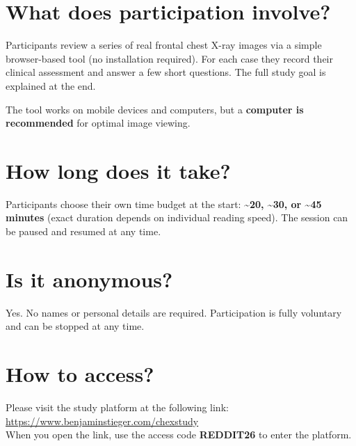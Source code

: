 \documentclass[10pt,a4paper]{article}
\begin{document}
\section{What does participation involve?}

Participants review a series of real frontal chest X-ray images via a simple browser-based tool (no installation required). For each case they record their clinical assessment and answer a few short questions. The full study goal is explained at the end. 

The tool works on mobile devices and computers, but a \textbf{computer is recommended} for optimal image viewing.

\section{How long does it take?}

Participants choose their own time budget at the start: \textbf{\textasciitilde20, \textasciitilde30, or \textasciitilde45 minutes} (exact duration depends on individual reading speed). The session can be paused and resumed at any time.

\section{Is it anonymous?}

Yes. No names or personal details are required. Participation is fully voluntary and can be stopped at any time.

\section{How to access?}

Please visit the study platform at the following link:\\[0.25em]
\url{https://www.benjaminstieger.com/chexstudy}\\[0.25em]
When you open the link, use the access code \textbf{REDDIT26} to enter the platform.

\vfill

\noindent{}
\end{document}
